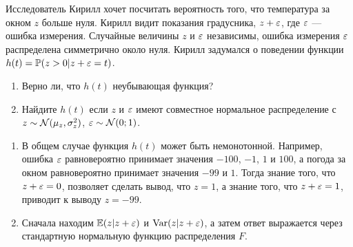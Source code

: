 \begin{problem}
Исследователь Кирилл хочет посчитать вероятность того, что температура за окном $z$ больше нуля.
Кирилл видит показания градусника, $z + \varepsilon$, где $\varepsilon$ — ошибка измерения.
Случайные величины $z$ и $\varepsilon$ независимы,
ошибка измерения $\varepsilon$ распределена симметрично около нуля.
Кирилл задумался о поведении функции $h(t)=\mathbb{P}(z > 0 | z + \varepsilon = t)$.

  \begin{enumerate}
      \item Верно ли, что $h(t)$ неубывающая функция?
      \item Найдите $h(t)$ если $z$ и $\varepsilon$ имеют совместное нормальное распределение с $z\sim \mathcal{N}(\mu_z, \sigma^2_z)$, $\varepsilon\sim \mathcal{N}(0;1)$.
  \end{enumerate}
  \begin{sol}
  \begin{enumerate}
    \item В общем случае функция $h(t)$ может быть немонотонной.
      Например, ошибка $\varepsilon$ равновероятно принимает значения $-100$, $-1$, $1$ и $100$,
      а погода за окном равновероятно принимает значения $-99$ и $1$.
      Тогда знание того, что $z+\varepsilon=0$, позволяет сделать вывод, что $z=1$,
      а знание того, что $z+\varepsilon = 1$, приводит к выводу $z=-99$.
    \item Сначала находим $\mathbb{E}(z|z+\varepsilon)$ и $\operatorname{Var}(z|z+\varepsilon)$, а затем ответ выражается через стандартную нормальную функцию распределения $F$.
  \end{enumerate}
\end{sol}
\end{problem}




